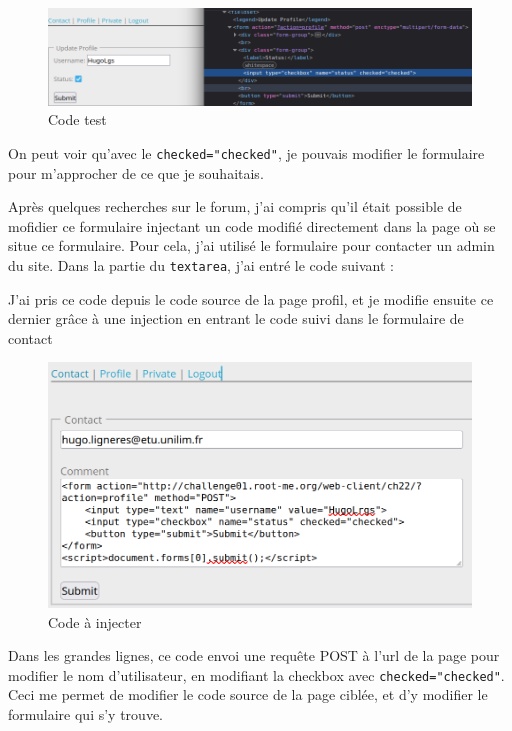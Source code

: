 \documentclass[12pt,a4paper]{article}
\begin{document}
\begin{figure}[!h]
	\centering
	\includegraphics[scale=.5]{code_a_injecter.png}
	\caption{Code test}
\end{figure}

On peut voir qu'avec le \texttt{checked="checked"}, je pouvais modifier le formulaire pour m'approcher de ce que je souhaitais. 


Après quelques recherches sur le forum, j'ai compris qu'il était possible de mofidier ce formulaire injectant un code modifié directement dans la page où se situe ce formulaire. Pour cela, j'ai utilisé le formulaire pour contacter un admin du site. Dans la partie du \texttt{textarea}, j'ai entré le code suivant : 



J'ai pris ce code depuis le code source de la page profil, et je modifie ensuite ce dernier grâce à une injection en entrant le code suivi dans le formulaire de contact

\begin{figure}[!h]
	\centering
	\includegraphics[scale=.45]{formulaire.png}
	\caption{Code à injecter}
\end{figure}
	
Dans les grandes lignes, ce code envoi une requête POST à l'url de la page pour modifier le nom d'utilisateur, en modifiant la checkbox avec \texttt{checked="checked"}. Ceci me permet de modifier le code source de la page ciblée, et d'y modifier le formulaire qui s'y trouve. \\
\end{document}
